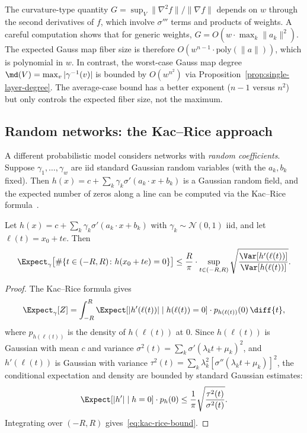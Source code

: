 \begin{remark}
The curvature-type quantity $G = \sup_V \|\nabla^2 f\|/\|\nabla f\|$ depends on $w$ through the second derivatives of $f$, which involve $\sigma'''$ terms and products of weights. A careful computation shows that for generic weights, $G = O(w \cdot \max_k \|a_k\|^2)$. The expected Gauss map fiber size is therefore $O(w^{n-1}\cdot \mathrm{poly}(\|a\|))$, which is polynomial in $w$. In contrast, the worst-case Gauss map degree $\md(V) = \max_v |\gamma^{-1}(v)|$ is bounded by $O(w^{n^2})$ via Proposition~\ref{prop:single-layer-degree}. The average-case bound has a better exponent ($n-1$ versus $n^2$) but only controls the expected fiber size, not the maximum.
\end{remark}

\subsection{Random networks: the Kac--Rice approach}

A different probabilistic model considers networks with \emph{random coefficients}. Suppose $\gamma_1,\ldots,\gamma_w$ are iid standard Gaussian random variables (with the $a_k, b_k$ fixed). Then $h(x) = c + \sum_k \gamma_k \sigma'(a_k\cdot x + b_k)$ is a Gaussian random field, and the expected number of zeros along a line can be computed via the Kac--Rice formula~\cite{adler2007random}.

\begin{proposition}\label{prop:kac-rice}
Let $h(x) = c + \sum_k \gamma_k \sigma'(a_k\cdot x + b_k)$ with $\gamma_k\sim \mathcal{N}(0,1)$ iid, and let $\ell(t) = x_0+te$. Then
\begin{equation}\label{eq:kac-rice-bound}
  \Expect_\gamma\bigl[\#\{t\in (-R,R)\colon h(x_0+te)=0\}\bigr] \leq \frac{R}{\pi}\cdot \sup_{t\in (-R,R)} \sqrt{\frac{\Var[h'(\ell(t))]}{\Var[h(\ell(t))]}}.
\end{equation}
\end{proposition}

\begin{proof}
The Kac--Rice formula gives
\begin{equation*}
  \Expect_\gamma[Z] = \int_{-R}^R \Expect[|h'(\ell(t))|\mid h(\ell(t))=0]\cdot p_{h(\ell(t))}(0)\,\diff{t},
\end{equation*}
where $p_{h(\ell(t))}$ is the density of $h(\ell(t))$ at $0$. Since $h(\ell(t))$ is Gaussian with mean $c$ and variance $\sigma^2(t) = \sum_k \sigma'(\lambda_k t+\mu_k)^2$, and $h'(\ell(t))$ is Gaussian with variance $\tau^2(t) = \sum_k \lambda_k^2 [\sigma''(\lambda_k t+\mu_k)]^2$, the conditional expectation and density are bounded by standard Gaussian estimates:
\begin{equation*}
  \Expect[|h'|\mid h = 0]\cdot p_h(0) \leq \frac{1}{\pi}\sqrt{\frac{\tau^2(t)}{\sigma^2(t)}}.
\end{equation*}
Integrating over $(-R,R)$ gives~\eqref{eq:kac-rice-bound}.
\end{proof}

